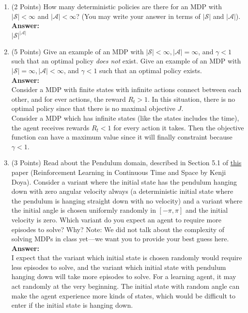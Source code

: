 \documentclass[]{article}
\begin{document}
\begin{enumerate}
    \item (2 Points) How many deterministic policies are there for an MDP with $|\mathcal S|< \infty$ and $|\mathcal A|<\infty$? (You may write your answer in terms of $|\mathcal S|$ and $|\mathcal A|$).\\
    \textbf{Answer:}\\
    $|\mathcal S|^{|\mathcal A|}$
    
    
    \item (5 Points) Give an example of an MDP with $|\mathcal S| < \infty, |\mathcal A| = \infty$, and $\gamma < 1$ such that an optimal policy \emph{does not} exist. Give an example of an MDP with $|\mathcal S| = \infty, |\mathcal A| < \infty$, and $\gamma < 1$ such that an optimal policy exists.\\
    \textbf{Answer:}\\
    Consider a MDP with finite states with infinite actions connect between each other, and for ever actions, the reward $R_t>1$. In this situation, there is no optimal policy since that there is no maximal objective $J$.\\
    Consider a MDP which has infinite states (like the states includes the time), the agent receives rewards $R_t<1$ for every action it takes. Then the objective function can have a maximum value since it will finally constraint because $\gamma<1$.
    
    \item (3 Points) Read about the Pendulum domain, described in Section 5.1 of \href{https://homes.cs.washington.edu/~todorov/courses/amath579/reading/Continuous.pdf}{this} paper (Reinforcement Learning in Continuous Time and Space by Kenji Doya). Consider a variant where the initial state has the pendulum hanging down with zero angular velocity always (a deterministic initial state where the pendulum is hanging straight down with no velocity) and a variant where the initial angle is chosen uniformly randomly in $[-\pi,\pi]$ and the initial velocity is zero. Which variant do you expect an agent to require more episodes to solve? Why? Note: We did not talk about the complexity of solving MDPs in class yet---we want you to provide your best guess here.
    \\
    \textbf{Answer:}\\
    I expect that the variant which initial state is chosen randomly would require less episodes to solve, and the variant which initial state with pendulum hanging down will take more episodes to solve. For a learning agent, it may act randomly at the very beginning. The initial state with random angle can make the agent experience more kinds of states, which would be difficult to enter if the initial state is hanging down.


\end{enumerate}
\end{document}
